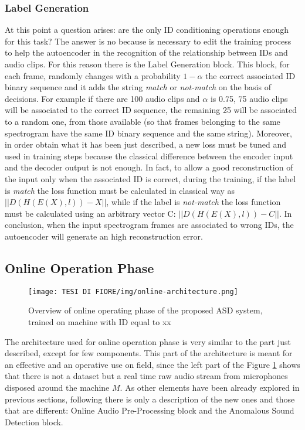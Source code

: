 \subsubsection{Label Generation}
At this point a question arises: are the only ID conditioning operations enough for this task? The answer is no because is necessary to edit the training process to help the autoencoder in the recognition of the relationship between IDs and audio clips. For this reason there is the Label Generation block. This block, for each frame, randomly changes with a probability $1-\alpha$ the correct associated ID binary sequence and it adds the string \textit{match} or \textit{not-match} on the basis of decisions. For example if there are 100 audio clips and $\alpha$ is 0.75, 75 audio clips will be associated to the correct ID sequence, the remaining 25 will be associated to a random one, from those available (so that frames belonging to the same spectrogram have the same ID binary sequence and the same string). Moreover, in order obtain what it has been just described, a new loss must be tuned and used in training steps because the classical difference between the encoder input and the decoder output is not enough. In fact, to allow a good reconstruction of the input only when the associated ID is correct, during the training, if the label is \textit{match} the loss function must be calculated in classical way as $||D(H(E(X),l)) - X||$,
while if the label is \textit{not-match} the loss function must be calculated using an arbitrary vector C: $||D(H(E(X),l)) - C||$.
In conclusion, when the input spectrogram frames are associated to wrong IDs, the autoencoder will generate an high reconstruction error.
\subsection{Online Operation Phase}
\begin{figure}[ht]
\texttt{[image: TESI DI FIORE/img/online-architecture.png]}
\centering
\caption{Overview of online operating phase of the proposed ASD system, trained on machine with ID equal to xx}
\label{online-asd-system}
\end{figure}
The architecture used for online operation phase is very similar to the part just described, except for few components. This part of the architecture is meant for an effective and an operative use on field, since the left part of the Figure \ref{online-asd-system} shows that there is not a dataset but a real time raw audio stream from microphones disposed around the machine $M$. As other elements have been already explored in previous sections, following  there is only a description of the new ones and those that are different: Online Audio Pre-Processing block and the Anomalous Sound Detection block. 
